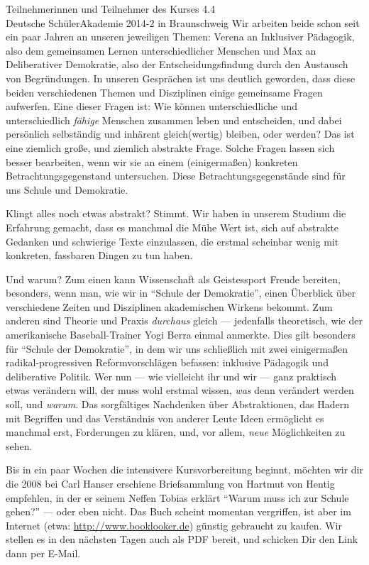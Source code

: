 \documentclass[a4paper]{letter}
\begin{document}
\begin{letter}{
	Teilnehmerinnen und Teilnehmer des Kurses 4.4 \\
	Deutsche SchülerAkademie 2014-2 in Braunschweig}
Wir arbeiten beide schon seit ein paar Jahren an unseren jeweiligen Themen: Verena an Inklusiver Pädagogik, also dem gemeinsamen Lernen unterschiedlicher Menschen und Max an Deliberativer Demokratie, also der Entscheidungsfindung durch den Austausch von Begründungen.
In unseren Gesprächen ist uns deutlich geworden, dass diese beiden verschiedenen Themen und Disziplinen einige gemeinsame Fragen aufwerfen.
Eine dieser Fragen ist:
Wie können unterschiedliche und unterschiedlich \emph{fähige} Menschen zusammen leben und entscheiden, und dabei persönlich selbständig und inhärent gleich(wertig) bleiben, oder werden?
Das ist eine ziemlich große, und ziemlich abstrakte Frage.
Solche Fragen lassen sich besser bearbeiten, wenn wir sie an einem (einigermaßen) konkreten Betrachtungsgegenstand untersuchen.
Diese Betrachtungsgegenstände sind für uns Schule und Demokratie.

Klingt alles noch etwas abstrakt?
Stimmt. 
Wir haben in unserem Studium die Erfahrung gemacht, dass es manchmal die Mühe Wert ist, sich auf abstrakte Gedanken und schwierige Texte einzulassen, die erstmal scheinbar wenig mit konkreten, fassbaren Dingen zu tun haben.

Und warum? 
Zum einen kann Wissenschaft als Geistessport Freude bereiten, besonders, wenn man, wie wir in ``Schule der Demokratie'', einen Überblick über verschiedene Zeiten und Disziplinen akademischen Wirkens bekommt.
Zum anderen sind Theorie und Praxis \emph{durchaus} gleich --- jedenfalls theoretisch, wie der amerikanische Baseball-Trainer Yogi Berra einmal anmerkte.
Dies gilt besonders für ``Schule der Demokratie'', in dem wir uns schließlich mit zwei einigermaßen radikal-progressiven Reformvorschlägen befassen: inklusive Pädagogik und deliberative Politik.
Wer nun --- wie vielleicht ihr und wir --- ganz praktisch etwas verändern will, der muss wohl erstmal wissen, \emph{was} denn verändert werden soll, und \emph{warum}.
Das sorgfältiges Nachdenken über Abstraktionen, das Hadern mit Begriffen und das Verständnis von anderer Leute Ideen ermöglicht es manchmal erst, Forderungen zu klären, und, vor allem, \emph{neue} Möglichkeiten zu sehen.

Bis in ein paar Wochen die intensivere Kursvorbereitung beginnt, möchten wir dir die 2008 bei Carl Hanser erschiene Briefsammlung von Hartmut von Hentig empfehlen, in der er seinem Neffen Tobias erklärt ``Warum muss ich zur Schule gehen?'' --- oder eben nicht.
Das Buch scheint momentan vergriffen, ist aber im Internet (etwa: \url{http://www.booklooker.de}) günstig gebraucht zu kaufen.
Wir stellen es in den nächsten Tagen auch als PDF bereit, und schicken Dir den Link dann per E-Mail.


\end{letter}
\end{document}
